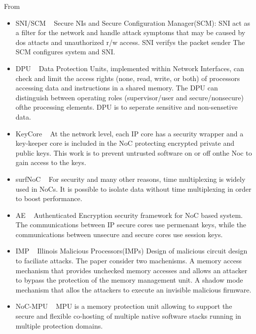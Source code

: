 \documentclass[]{article}
\begin{document}
From~\cite{ancajas2014fort,js2015runtime}
\begin{itemize} 
	\item SNI/SCM	~\cite{diguet2007noc}
		Secure NIs and Secure Configuration Manager(SCM): SNI act as a filter for
	the network and handle attack symptoms that may be caused by dos attacts and
	unauthorized r/w access. SNI verifys the packet sender The SCM configures
	system and SNI.
	\item DPU		~\cite{fiorin2008secure}
		Data Protection Units, implemented within Network Interfaces, can check and
	limit the access rights (none, read, write, or both) of processors accessing
	data and instructions in a shared memory. The DPU can distinguish between
	operating roles (supervisor/user and secure/nonsecure) ofthe processing
	elements. DPU is to seperate sensitive and non-sensetive data.
	\item KeyCore	~\cite{gebotys2003framework}
		At the network level, each IP core has a security wrapper and a
	key-keeper core is included in the NoC protecting encrypted private and public
	keys. This work is to prevent untrusted software on or off onthe Noc to
	gain access to the keys.
	\item surfNoC	~\cite{wassel2013surfnoc}
		For security and many other reasons, time multiplexing is widely used
	in NoCs. It is possible to isolate data without time multiplexing in order to
	boost performance.
	\item AE		~\cite{kapoor2013security}
		Authenticated Encryption security framework for NoC based system. The
	communications between IP secure cores use permenant keys, while the
	communications between unsecure and secure cores use session keys.
	\item IMP		~\cite{king2008designing}
		Illinois Malicious Processors(IMPs) Design of malicious circuit design
		to faciliate attacks. The paper consider two machenisms. A memory access
        mechanism that provides unchecked memory accesses and allows an attacker
        to bypass the protection of the memory management unit. A shadow mode
        mechanism that allos the attackers to execute an invisible malicious
        firmware.
	\item NoC-MPU	~\cite{porquet2011noc}
        MPU is a memory protection unit allowing to support the secure and
        flexible co-hosting of multiple native software stacks running in
        multiple protection domains.
\end{itemize}
\end{document}
